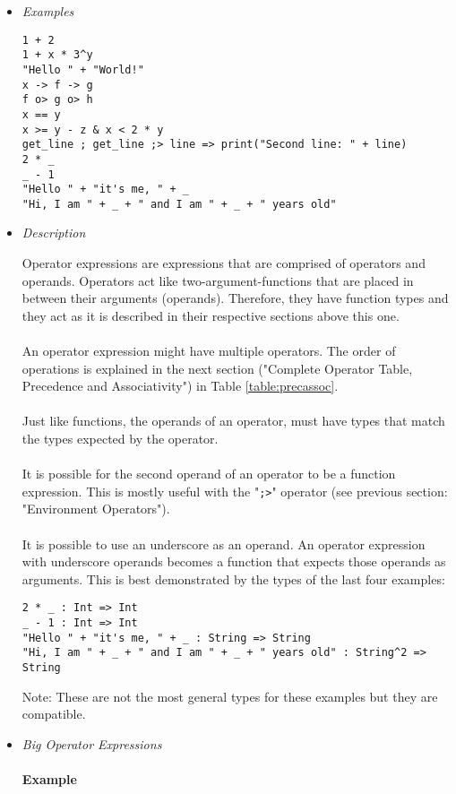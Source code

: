 \documentclass[diploma]{softlab-thesis}
\begin{document}
\begin{itemize}
\item \textit{Examples}
\begin{verbatim}
1 + 2
1 + x * 3^y
"Hello " + "World!"
x -> f -> g
f o> g o> h
x == y
x >= y - z & x < 2 * y
get_line ; get_line ;> line => print("Second line: " + line)
2 * _
_ - 1
"Hello " + "it's me, " + _
"Hi, I am " + _ + " and I am " + _ + " years old"
\end{verbatim}

\item \textit{Description}

Operator expressions are expressions that are comprised of operators and
operands. Operators act like two-argument-functions that are placed in between
their arguments (operands).  Therefore, they have function types and they act
as it is described in their respective sections above this one.
\\\\
An operator expression might have multiple operators. The order of operations
is explained in the next section ("Complete Operator Table, Precedence and
Associativity") in Table \ref{table:precassoc}.
\\\\
Just like functions, the operands of an operator, must have types that match
the types expected by the operator.
\\\\
It is possible for the second operand of an operator to be a function
expression.  This is mostly useful with the "\verb|;>|" operator (see
previous section: "Environment Operators").
\\\\
It is possible to use an underscore as an operand. An operator expression with
underscore operands becomes a function that expects those operands as
arguments.  This is best demonstrated by the types of the last four examples:

\begin{verbatim}
2 * _ : Int => Int
_ - 1 : Int => Int
"Hello " + "it's me, " + _ : String => String
"Hi, I am " + _ + " and I am " + _ + " years old" : String^2 => String
\end{verbatim}
Note: These are not the most general types for these examples but they are
compatible.

\newpage

\item \textit{Big Operator Expressions}\\\\
\textbf{Example}


\end{itemize}
\end{document}

